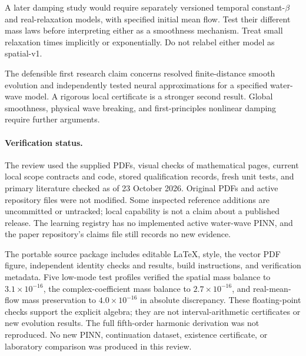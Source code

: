 \documentclass[11pt]{article}
\begin{document}
A later damping study would require separately versioned temporal
constant-\(\beta\) and real-relaxation models, with specified initial
mean flow. Test their different mass laws before interpreting either
as a smoothness mechanism. Treat small relaxation times implicitly
or exponentially. Do not relabel either model as spatial-v1.

The defensible first research claim concerns resolved finite-distance
smooth evolution and independently tested neural approximations
for a specified water-wave model. A rigorous local certificate is
a stronger second result. Global smoothness, physical wave breaking,
and first-principles nonlinear damping require further arguments.

\paragraph{Verification status.}
The review used the supplied PDFs, visual checks of mathematical
pages, current local scope contracts and code, stored qualification
records, fresh unit tests, and primary literature checked as of
23 October 2026. Original PDFs and active repository files were not
modified. Some inspected reference additions are uncommitted or
untracked; local capability is not a claim about a published release.
The learning registry has no implemented active water-wave PINN, and
the paper repository's claims file still records no new evidence.

The portable source package includes editable LaTeX, style,
the vector PDF figure, independent identity checks and results,
build instructions, and verification metadata.
Five low-mode test profiles verified the spatial mass balance to
\(3.1\times10^{-16}\), the complex-coefficient mass balance to
\(2.7\times10^{-16}\), and real-mean-flow mass preservation to
\(4.0\times10^{-16}\) in absolute discrepancy.
These floating-point checks support the explicit algebra; they
are not interval-arithmetic certificates or new evolution results.
The full fifth-order harmonic derivation was not reproduced.
No new PINN, continuation dataset, existence certificate,
or laboratory comparison was produced in this review.
\end{document}
